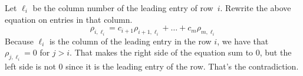 \begin{exercises}
\begin{answer}
\begin{exparts}
          Let $\ell_{i}$ be the column number of the leading entry of
          row~$i$. 
          Rewrite the above equation on entries in that column.
          \begin{equation*}
             \rho_{i,\ell_{i}}=c_{i+1}\rho_{i+1,\ell_{i}}
                             +\dots+c_m\rho_{m,\ell_{i}}
          \end{equation*}
          Because $\ell_{i}$ is the column of the leading entry in the
          row $i$, we have that $\rho_{j,\ell_{i}}=0$ for $j>i$.
          That makes the right side of the equation sum to $0$, but the
          left side is not $0$ since it is the leading entry of the row. 
          That's the contradiction. 
      \end{exparts}  
    \end{answer}



\end{exercises}
